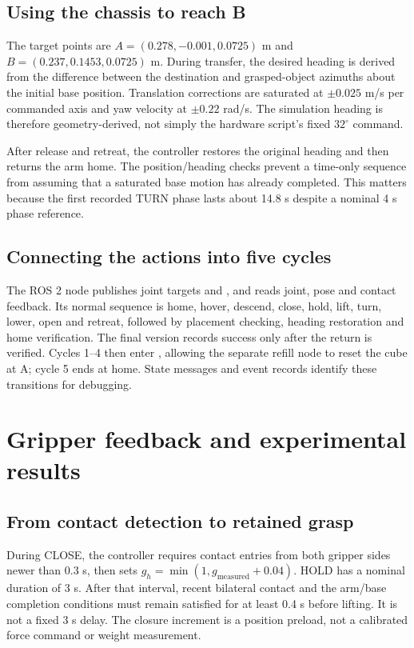 \subsection{Using the chassis to reach B}
The target points are $A=(0.278,-0.001,0.0725)$ m and $B=(0.237,0.1453,0.0725)$ m. During transfer, the desired heading is derived from the difference between the destination and grasped-object azimuths about the initial base position. Translation corrections are saturated at $\pm0.025$ m/s per commanded axis and yaw velocity at $\pm0.22$ rad/s. The simulation heading is therefore geometry-derived, not simply the hardware script's fixed $32^\circ$ command.

After release and retreat, the controller restores the original heading and then returns the arm home. The position/heading checks prevent a time-only sequence from assuming that a saturated base motion has already completed. This matters because the first recorded TURN phase lasts about 14.8 s despite a nominal 4 s phase reference.
\subsection{Connecting the actions into five cycles}
The ROS 2 node publishes joint targets and , and reads joint, pose and contact feedback. Its normal sequence is home, hover, descend, close, hold, lift, turn, lower, open and retreat, followed by placement checking, heading restoration and home verification. The final version records success only after the return is verified. Cycles 1--4 then enter , allowing the separate refill node to reset the cube at A; cycle 5 ends at home. State messages and event records identify these transitions for debugging.
\clearpage
\section{Gripper feedback and experimental results}
\subsection{From contact detection to retained grasp}
During CLOSE, the controller requires contact entries from both gripper sides newer than 0.3 s, then sets $g_h=\min(1,g_{\mathrm{measured}}+0.04)$. HOLD has a nominal duration of 3 s. After that interval, recent bilateral contact and the arm/base completion conditions must remain satisfied for at least 0.4 s before lifting. It is not a fixed 3 s delay. The closure increment is a position preload, not a calibrated force command or weight measurement.

